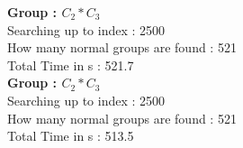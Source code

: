 \textbf{Group : $C_2*C_3$}\\
Searching up to index : 2500\\
How many normal groups are found : 521\\
Total Time in s : 521.7\\
\textbf{Group : $C_2*C_3$}\\
Searching up to index : 2500\\
How many normal groups are found : 521\\
Total Time in s : 513.5\\

